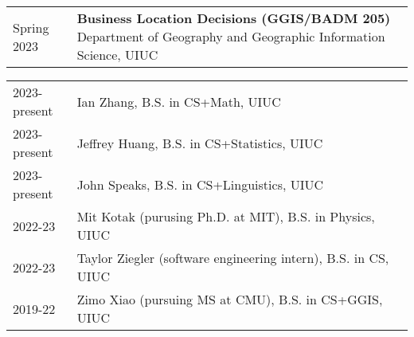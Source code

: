 \documentclass{acmcv}
\begin{document}





    
\vspace*{0.25cm}


    \begin{longtable}{p{0.16\linewidth} p{0.84\linewidth}}
        Spring 2023 & \textbf{Business Location Decisions (GGIS/BADM 205)} \newline Department of Geography and Geographic Information Science, UIUC \\

    \end{longtable}

    \begin{longtable}{p{0.16\linewidth} p{0.84\linewidth}}
        2023-present & Ian Zhang, B.S. in CS+Math, UIUC \\
        2023-present & Jeffrey Huang, B.S. in CS+Statistics, UIUC \\
        2023-present & John Speaks, B.S. in CS+Linguistics, UIUC\\
        2022-23 & Mit Kotak (purusing Ph.D. at MIT), B.S. in Physics, UIUC\\
        2022-23 & Taylor Ziegler (software engineering intern), B.S. in CS, UIUC\\
        2019-22 & Zimo Xiao (pursuing MS at CMU), B.S. in CS+GGIS, UIUC\\
    \end{longtable}
\end{document}
